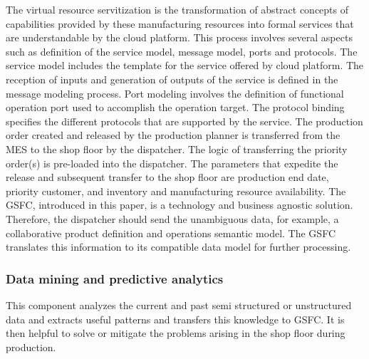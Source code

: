 \documentclass[10pt,conference,compsocconf]{IEEEtran}
\begin{document}
The virtual resource servitization is the transformation of abstract concepts of capabilities provided by these manufacturing resources into formal services that are understandable by the cloud platform. This process involves several aspects such as definition of the service model, message model, ports and protocols. The service model includes the template for the service offered by cloud platform. The reception of inputs and generation of outputs of the service is defined in the message modeling process. Port modeling involves the definition of functional operation port used to accomplish the operation target. The protocol binding specifies the different protocols that are supported by the service.
The production order created and released by the production planner is transferred from the MES to the shop floor by the dispatcher. The logic of transferring the priority order(s) is pre-loaded into the dispatcher. The parameters that expedite the release and subsequent transfer to the shop floor are production end date, priority customer, and inventory and manufacturing resource availability. The GSFC, introduced in this paper, is a technology and business agnostic solution. Therefore, the dispatcher should send the unambiguous data, for example, a collaborative product definition and operations semantic model. The GSFC translates this information to its compatible data model for further processing.

\subsubsection{Data mining and predictive analytics}
This component analyzes the current and past semi structured or unstructured data and extracts useful patterns and transfers this knowledge to GSFC. It is then helpful to solve or mitigate the problems arising in the shop floor during production.
\end{document}
